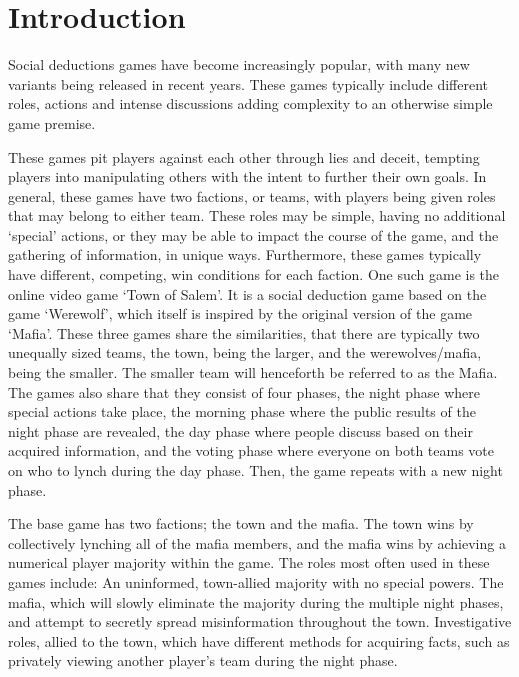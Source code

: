 \section{Introduction}
Social deductions games have become increasingly popular, with many new 
variants being released in recent years. These games typically include different roles, actions and intense discussions adding complexity to an 
otherwise simple game premise. 

These games pit players against each other 
through lies and deceit, tempting players into manipulating others with the 
intent to further their own goals. In general, these games have two factions,
or teams, with players being given roles that may belong to either team. These 
roles may be simple, having no additional ‘special’ actions, or they may be 
able to impact the course of the game, and the gathering of information, in 
unique ways. Furthermore, these games typically have different, competing, win 
conditions for each faction. One such game is 
the online video game ‘Town of Salem’. It is a social deduction game based on 
the game ‘Werewolf’, which itself is inspired by the original version of the 
game ‘Mafia’. These three games share the similarities, that there are 
typically two unequally sized teams, the town, being the larger, and the 
werewolves/mafia, being the smaller. The smaller team will henceforth be 
referred to as the Mafia. The games also share that they consist of four 
phases, the night phase where special actions take place, the morning phase 
where the public results of the night phase are revealed, the day phase where 
people discuss based on their acquired information, and the voting phase where 
everyone on both teams vote on who to lynch during the day phase. Then, the 
game repeats with a new night phase. 

The base game has two factions; the town and the mafia. The town wins by 
collectively lynching all of the mafia members, and the mafia wins by achieving 
a numerical player majority within the game. The roles most often used in these 
games include: An uninformed, town-allied majority with no special powers. The 
mafia, which will slowly eliminate the majority during the multiple night 
phases, and attempt to secretly spread misinformation throughout the town. 
Investigative roles, allied to the town, which have different methods for 
acquiring facts, such as privately viewing another player’s team during the 
night phase. 

